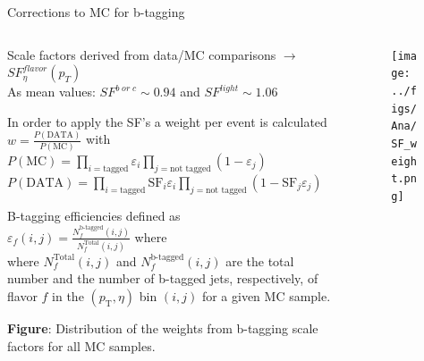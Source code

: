 \begin{frame}{Corrections to MC for b-tagging}
\vspace{-.2cm}

\begin{columns}
\begin{column}{.50\textwidth}
\begin{block}{}
\scriptsize Scale factors derived from data/MC comparisons $\to$ $SF^{flavor}_{\eta}(p_{T})$\\
As mean values: $SF^{b\; or\; c}\sim 0.94$ and $SF^{light}\sim 1.06$
\end{block}
\vspace{-.2cm}
\begin{block}{}
\scriptsize In order to apply the SF's a weight per event is calculated\\
$w=\frac{P(\text{DATA})}{P(\text{MC})}$ with \\ \tiny{
$P(\text{MC}) = \prod_{i=\text{tagged}} \varepsilon_i \prod_{j=\text{not tagged}} (1-\varepsilon_j)$\\
$P(\text{DATA}) = \prod_{i=\text{tagged}} \text{SF}_i \varepsilon_i \prod_{j=\text{not tagged}} (1-\text{SF}_j \varepsilon_j)$ \\
}
\end{block}
\vspace{-.2cm}
\begin{block}{}
\tiny B-tagging efficiencies defined as\\
$\varepsilon_f(i,j) = \frac{N_f^\text{b-tagged}(i,j)}{N_f^\text{Total}(i,j)}$ where \\
where $ N_f^\text{Total}(i,j) $ and $ N_f^\text{b-tagged}(i,j) $ are the total number and the number of b-tagged jets, respectively, of flavor $ f $ in the $ (p_\text{T},\eta) $ bin $ (i,j) $ for a given MC sample.
\end{block}
\vspace{-.2cm}
\begin{block}{}
\scriptsize \textbf{Figure}: Distribution of the weights from b-tagging scale factors for all MC samples.
\end{block}
\end{column}

\begin{column}{.50\textwidth}
\begin{figure}[!Hhtbp]
  \begin{center}
    \texttt{[image: ../figs/Ana/SF\_weight.png]}
  \end{center}
\end{figure}
\end{column}

\end{columns}
\end{frame}

